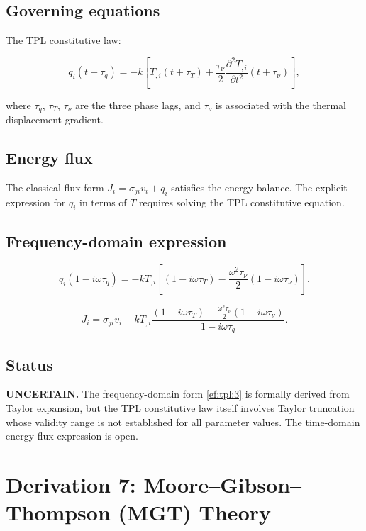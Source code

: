 \documentclass{article}
\begin{document}
\subsection{Governing equations}

The TPL constitutive law:

\begin{equation}
q_i(t + \tau_q) = -k\left[T_{,i}(t + \tau_T) + \frac{\tau_\nu}{2}\frac{\partial^2 T_{,i}}{\partial t^2}(t + \tau_\nu)\right],
\label{ef:tpl:1}
\end{equation}

where $\tau_q$, $\tau_T$, $\tau_\nu$ are the three phase lags, and $\tau_\nu$ is associated with the thermal displacement gradient.

\subsection{Energy flux}

The classical flux form $J_i = \sigma_{ji}v_i + q_i$ satisfies the energy balance. The explicit expression for $q_i$ in terms of $T$ requires solving the TPL constitutive equation.

\subsection{Frequency-domain expression}

\begin{equation}
q_i(1 - i\omega\tau_q) = -k T_{,i}\left[(1 - i\omega\tau_T) - \frac{\omega^2\tau_\nu}{2}(1 - i\omega\tau_\nu)\right].
\label{ef:tpl:2}
\end{equation}

\begin{equation}
J_i = \sigma_{ji}v_i - k T_{,i}\frac{(1 - i\omega\tau_T) - \frac{\omega^2\tau_\nu}{2}(1 - i\omega\tau_\nu)}{1 - i\omega\tau_q}.
\label{ef:tpl:3}
\end{equation}

\subsection{Status}

\textbf{UNCERTAIN.} The frequency-domain form \eqref{ef:tpl:3} is formally derived from Taylor expansion, but the TPL constitutive law itself involves Taylor truncation whose validity range is not established for all parameter values. The time-domain energy flux expression is open.

\section{Derivation 7: Moore--Gibson--Thompson (MGT) Theory}
\end{document}
